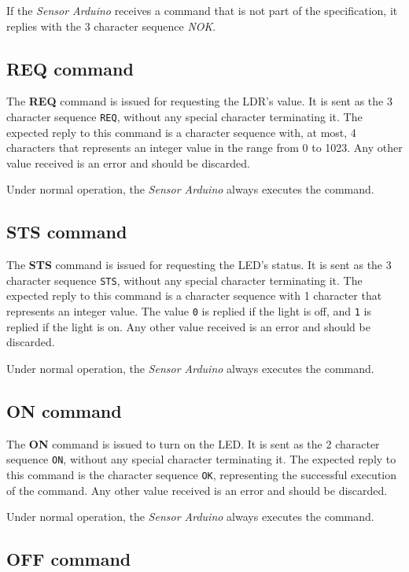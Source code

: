 \documentclass[conference, a4paper]{IEEEtran}
\begin{document}
If the \textit{Sensor Arduino} receives a command that is not part of the specification, it replies with the 3 character sequence \textit{NOK}.

\subsection{REQ command}

The \textbf{REQ} command is issued for requesting the LDR's value. It is sent as the 3 character sequence \texttt{REQ}, without any special character terminating it. The expected reply to this command is a character sequence with, at most, 4 characters that represents an integer value in the range from 0 to 1023. Any other value received is an error and should be discarded.

Under normal operation, the \textit{Sensor Arduino} always executes the command.

\subsection{STS command}

The \textbf{STS} command is issued for requesting the LED's status. It is sent as the 3 character sequence \texttt{STS}, without any special character terminating it. The expected reply to this command is a character sequence with 1 character that represents an integer value. The value \texttt{0} is replied if the light is off, and \texttt{1} is replied if the light is on. Any other value received is an error and should be discarded.

Under normal operation, the \textit{Sensor Arduino} always executes the command.

\subsection{ON command}

The \textbf{ON} command is issued to turn on the LED. It is sent as the 2 character sequence \texttt{ON}, without any special character terminating it. The expected reply to this command is the character sequence \texttt{OK}, representing the successful execution of the command. Any other value received is an error and should be discarded.

Under normal operation, the \textit{Sensor Arduino} always executes the command.

\subsection{OFF command}
\end{document}
